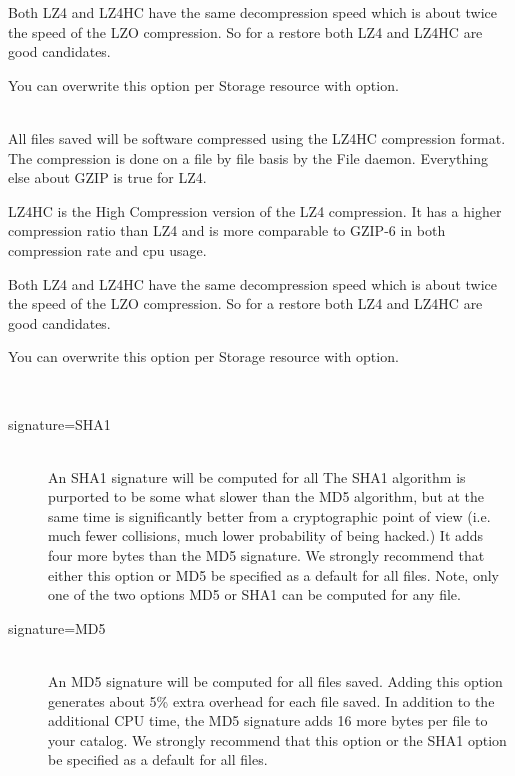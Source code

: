 \begin{description}
\begin{description}
        Both LZ4 and LZ4HC have the same decompression speed which is about twice
        the speed of the LZO compression. So for a restore both LZ4 and LZ4HC are
        good candidates.

        You can overwrite this option per Storage resource with
         option.

        \item [compression=LZ4HC] \hfill \\
        All files saved will be software compressed using the LZ4HC
        compression format. The compression is done on a file by file basis by
        the File daemon. Everything else about GZIP is true for LZ4.

        LZ4HC is the High Compression version of the LZ4 compression. It has
        a higher compression ratio than LZ4 and is more comparable to GZIP-6
        in both compression rate and cpu usage.

        Both LZ4 and LZ4HC have the same decompression speed which is about twice
        the speed of the LZO compression. So for a restore both LZ4 and LZ4HC are
        good candidates.

        You can overwrite this option per Storage resource with
         option.
    \end{description}

 \item [signature={\textless}SHA1{\textbar}MD5{\textgreater}] \hfill \\
    \begin{description}
        \item [signature=SHA1] \hfill \\
        An SHA1 signature will be computed for all The SHA1 algorithm is
        purported to be some what slower than the MD5 algorithm, but at the same
        time is significantly better from a cryptographic point of view (i.e.
        much fewer collisions, much lower probability of being hacked.) It adds
        four more bytes than the MD5 signature.  We strongly recommend that
        either this option or MD5 be specified as a default for all files.
        Note, only one of the two options MD5 or SHA1 can be computed for any
        file.

        \item [signature=MD5] \hfill \\
        An MD5 signature will be computed for all files saved.  Adding this
        option generates about 5\% extra overhead for each file saved.  In
        addition to the additional CPU time, the MD5 signature adds 16 more
        bytes per file to your catalog.  We strongly recommend that this option
        or the SHA1 option be specified as a default for all files.
    \end{description}



\end{description}

